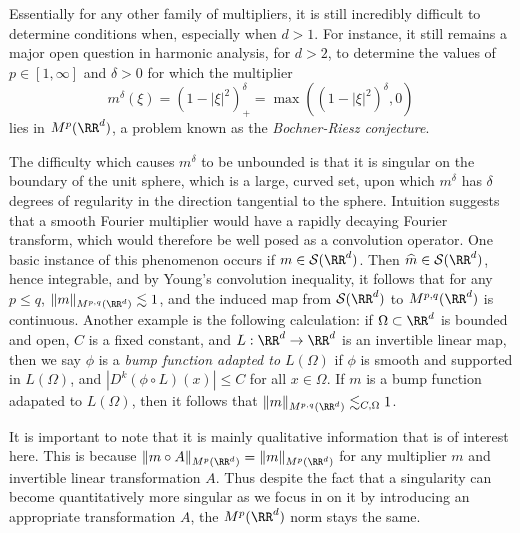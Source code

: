 Essentially for any other family of multipliers, it is still incredibly difficult to determine conditions when, especially when $d > 1$. For instance, it still remains a major open question in harmonic analysis, for $d > 2$, to determine the values of $p \in [1,\infty]$ and $\delta > 0$ for which the multiplier
%
\[ m^\delta(\xi) = (1 - |\xi|^2)^\delta_+ = \max((1 - |\xi|^2)^\delta,0) \]
%
lies in $M^p(\RR^d)$, a problem known as the \emph{Bochner-Riesz conjecture}.

The difficulty which causes $m^\delta$ to be unbounded is that it is singular on the boundary of the unit sphere, which is a large, curved set, upon which $m^\delta$ has $\delta$ degrees of regularity in the direction tangential to the sphere. Intuition suggests that a smooth Fourier multiplier would have a rapidly decaying Fourier transform, which would therefore be well posed as a convolution operator. One basic instance of this phenomenon occurs if $m \in \mathcal{S}(\RR^d)$. Then $\widehat{m} \in \mathcal{S}(\RR^d)$, hence integrable, and by Young's convolution inequality, it follows that for any $p \leq q$, $\| m \|_{M^{p,q}(\RR^d)} \lesssim 1$, and the induced map from $\mathcal{S}(\RR^d)$ to $M^{p,q}(\RR^d)$ is continuous. Another example is the following calculation: if $\Omega \subset \RR^d$ is bounded and open, $C$ is a fixed constant, and $L: \RR^d \to \RR^d$ is an invertible linear map, then we say $\phi$ is a \emph{bump function adapted to $L(\Omega)$} if $\phi$ is smooth and supported in $L(\Omega)$, and $|D^k (\phi \circ L)(x)| \leq C$ for all $x \in \Omega$. If $m$ is a bump function adapated to $L(\Omega)$, then it follows that $\| m \|_{M^{p,q}(\RR^d)} \lesssim_{C,\Omega} 1$.

It is important to note that it is mainly qualitative information that is of interest here. This is because $\| m \circ A \|_{M^p(\RR^d)} = \| m \|_{M^p(\RR^d)}$ for any multiplier $m$ and invertible linear transformation $A$. Thus despite the fact that a singularity can become quantitatively more singular as we focus in on it by introducing an appropriate transformation $A$, the $M^p(\RR^d)$ norm stays the same.

